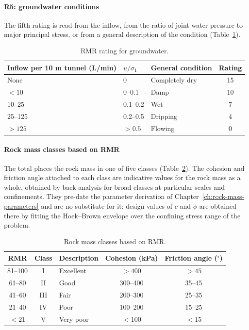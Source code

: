 \paragraph{R5: groundwater conditions}
The fifth rating is read from the inflow, from the ratio of joint water
pressure to major principal stress, or from a general description of the
condition (Table~\ref{tab:rmr_groundwater}).

\begin{table}[htbp]
\caption{RMR rating for groundwater.}
\label{tab:rmr_groundwater}
\centering
\small
\begin{tabular}{l l l c}
\toprule
\textbf{Inflow per 10 m tunnel (L/min)} & \textbf{\(u/\sigma_1\)} & \textbf{General condition} & \textbf{Rating} \\
\midrule
None & 0 & Completely dry & 15 \\
\(<10\) & 0--0.1 & Damp & 10 \\
10--25 & 0.1--0.2 & Wet & 7 \\
25--125 & 0.2--0.5 & Dripping & 4 \\
\(>125\) & \(>0.5\) & Flowing & 0 \\
\bottomrule
\end{tabular}
\end{table}

\paragraph{Rock mass classes based on RMR}
The total places the rock mass in one of five classes
(Table~\ref{tab:rmr_classes}). The cohesion and friction angle attached to
each class are indicative values for the rock mass as a whole, obtained by
back-analysis for broad classes at particular scales and confinements. They
pre-date the parameter derivation of Chapter~\ref{ch:rock-mass-parameters} and
are no substitute for it: design values of $c$ and $\phi$ are obtained there by
fitting the Hoek--Brown envelope over the confining stress range of the
problem.

\begin{table}[htbp]
\caption{Rock mass classes based on RMR.}
\label{tab:rmr_classes}
\centering
\small
\begin{tabular}{c c l c c}
\toprule
\textbf{RMR} & \textbf{Class} & \textbf{Description} & \textbf{Cohesion (kPa)} & \textbf{Friction angle (\(^\circ\))} \\
\midrule
81--100 & I & Excellent & \(>400\) & \(>45\) \\
61--80 & II & Good & 300--400 & 35--45 \\
41--60 & III & Fair & 200--300 & 25--35 \\
21--40 & IV & Poor & 100--200 & 15--25 \\
\(<21\) & V & Very poor & \(<100\) & \(<15\) \\
\bottomrule
\end{tabular}
\end{table}

